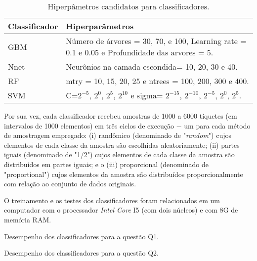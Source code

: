 \documentclass[11pt,twoside]{article}
\begin{document}
\begin{table}[!ht]\centering
	\begin{tabular}{@{} p{3cm}  p{12cm}@{}}
		\toprule
		\textbf{Classificador} & \textbf{Hiperparâmetros} \\ 
		\midrule
    GBM & Número de árvores = 30, 70, e 100, Learning rate = 0.1 e 0.05 e 
Profundidade das arvores = 5.\\ 
		Nnet & Neurônios na camada escondida= 10, 20, 30 e 40.\\ 
    RF & mtry = 10, 15, 20, 25 e ntrees = 100, 200, 300 e 400.\\
		SVM & C=$2^{-5}$, $2^{0}$, $2^{5}$, $2^{10}$ e sigma= $2^{-15}$, $2^{-10}$, 
$2^{-5}$, $2^{0}$, $2^5$.\\
		\bottomrule
	\end{tabular}
	 \caption{Hiperpâmetros candidatos para classificadores.}
  	 \label{tab:hiperparametros}
\end{table}

Por sua vez, cada classificador recebeu amostras de 1000 a 6000 tíquetes (em intervalos de 1000 elementos) em três ciclos de execução $-$ um para cada método de amostragem 
empregado: (i) randômico (denominado de "\textit{random}") cujos elementos de cada classe da amostra são escolhidas aleatoriamente; (ii) partes iguais (denominado de "1/2")
cujos elementos de cada classe da amostra são distribuídos em partes iguais; e o (iii) proporcional (denominado de "proportional") cujos elementos da amostra são distribuídos 
proporcionalmente com relação ao conjunto de dados originais\cite{JAS1}. 

O treinamento e os testes dos classificadores foram relacionados em um computador com o processador \textit{Intel Core} I5 (com dois núcleos)  e com 8G de memória RAM.

\begin{sidewaystable}[ph!]
  \begin{center}
  \tiny
  \pgfplotstabletypeset[]{\loadedtable}
  \end{center}
  \caption{Desempenho dos classificadores para a questão Q1.}
  \label{tab:desempenho-para-q1}
\end{sidewaystable}

\begin{sidewaystable}[ph!]
  
  \begin{center}
  \tiny
  \pgfplotstabletypeset[]{\loadedtable}
  \end{center}
  \caption{Desempenho dos classificadores para a questão Q2.}
  \label{tab:desempenho-para-q2}
\end{sidewaystable}
\end{document}
